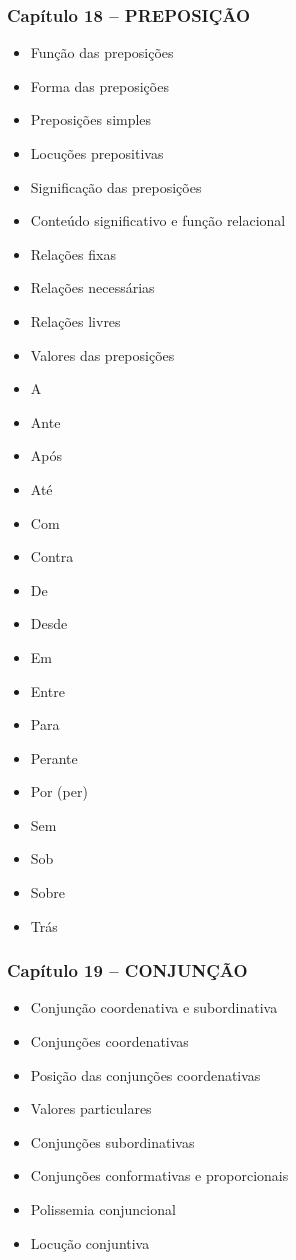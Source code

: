 \documentclass[a4paper,12pt]{article}[abntex2]
\begin{document}
\subsubsection*{Capítulo 18 – PREPOSIÇÃO}
\begin{itemize}
    \item Função das preposições
    \item Forma das preposições
    \item Preposições simples
    \item Locuções prepositivas
    \item Significação das preposições
    \item Conteúdo significativo e função relacional
    \item Relações fixas
    \item Relações necessárias
    \item Relações livres
    \item Valores das preposições
    \item A
    \item Ante
    \item Após
    \item Até
    \item Com
    \item Contra
    \item De
    \item Desde
    \item Em
    \item Entre
    \item Para
    \item Perante
    \item Por (per)
    \item Sem
    \item Sob
    \item Sobre
    \item Trás
\end{itemize}

\subsubsection*{Capítulo 19 – CONJUNÇÃO}
\begin{itemize}
    \item Conjunção coordenativa e subordinativa
    \item Conjunções coordenativas
    \item Posição das conjunções coordenativas
    \item Valores particulares
    \item Conjunções subordinativas
    \item Conjunções conformativas e proporcionais
    \item Polissemia conjuncional
    \item Locução conjuntiva
\end{itemize}
\end{document}
